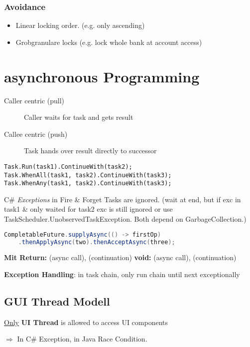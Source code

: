 \begin{multicols*}{4}
    \subsubsection{Avoidance}
        \begin{itemize}
            \item Linear locking order. (e.g. only ascending)
            \item Grobgranulare locks (e.g. lock whole bank at account access)
        \end{itemize}

\section{asynchronous Programming}
\begin{description}
	\item[Caller centric (pull)] Caller waits for task and gets result
	\item[Callee centric (push)] Task hands over result directly to successor
\end{description}

\begin{lstlisting}[language={[Sharp]C}]
Task.Run(task1).ContinueWith(task2);
Task.WhenAll(task1, task2).ContinueWith(task3);
Task.WhenAny(task1, task2).ContinueWith(task3);
\end{lstlisting}
C\# \textit{Exceptions} in Fire \& Forget Tasks are ignored. (wait at end, but if exc in task1 \& only waited for task2 exc is still ignored or use TaskScheduler.UnobservedTaskException. Both depend on GarbageCollection.)

\begin{lstlisting}[language=java]
CompletableFuture.supplyAsync(() -> firstOp)
	.thenApplyAsync(two).thenAcceptAsync(three);
\end{lstlisting}
\textbf{Mit Return:}  (async call),  (continuation)
\textbf{void:}  (async call),  (continuation)

\textbf{Exception Handling}:  in task chain, only run chain until next exceptionally

\subsection{GUI Thread Modell}
\underline{Only} \textbf{UI Thread} is allowed to access UI components

$\Rightarrow$ In C\# Exception, in Java Race Condition.


\end{multicols*}
